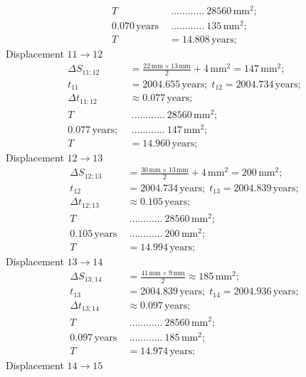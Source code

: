 \begin{description}
\begin{align*}
    T\ &\ \dots\dots\dots\dots\ 28560\,\mathrm{mm}^2;\\
    0.070\,\mathrm{years}\ &\ \dots\dots\dots\dots\ 135\,\mathrm{mm}^2;\\
    T &= 14.808\,\mathrm{years};
  \end{align*}
  Displacement $11 \rightarrow 12$
  \begin{align*}
    \Delta S_{11;12} &= \frac{22\,\mathrm{mm}\times13\,\mathrm{mm}}{2}
      + 4\,\mathrm{mm}^2 = 147\,\mathrm{mm}^2;\\
    t_{11} &= 2004.655\,\mathrm{years};\; t_{12} = 2004.734\,\mathrm{years};\\
    \Delta t_{11;12} &\approx 0.077\,\mathrm{years};\\
    T\ &\ \dots\dots\dots\dots\ 28560\,\mathrm{mm}^2;\\
    0.077\,\mathrm{years};\ &\ \dots\dots\dots\dots\ 147\,\mathrm{mm}^2;\\
    T &= 14.960\,\mathrm{years};
  \end{align*}
  Displacement $12 \rightarrow 13$
  \begin{align*}
    \Delta S_{12;13} &= \frac{30\,\mathrm{mm}\times13\,\mathrm{mm}}{2}
      + 4\,\mathrm{mm}^2 = 200\,\mathrm{mm}^2;\\
    t_{12} &= 2004.734\,\mathrm{years};\; t_{13} = 2004.839\,\mathrm{years};\\
    \Delta t_{12;13} &\approx 0.105\,\mathrm{years};\\
    T\ &\ \dots\dots\dots\dots\ 28560\,\mathrm{mm}^2;\\
    0.105\,\mathrm{years}\ &\ \dots\dots\dots\dots\ 200\,\mathrm{mm}^2;\\
    T &= 14.994\,\mathrm{years};
  \end{align*}
  Displacement $13 \rightarrow 14$
  \begin{align*}
    \Delta S_{13;14} &= \frac{41\,\mathrm{mm}\times9\,\mathrm{mm}}{2}
      \approx 185\,\mathrm{mm}^2;\\
    t_{13} &= 2004.839\,\mathrm{years};\; t_{14} = 2004.936\,\mathrm{years};\\
    \Delta t_{13;14} &\approx 0.097\,\mathrm{years};\\
    T\ &\ \dots\dots\dots\dots\ 28560\,\mathrm{mm}^2;\\
    0.097\,\mathrm{years}\ &\ \dots\dots\dots\dots\ 185\,\mathrm{mm}^2;\\
    T &= 14.974\,\mathrm{years};
  \end{align*}
  Displacement $14 \rightarrow 15$

\end{description}
